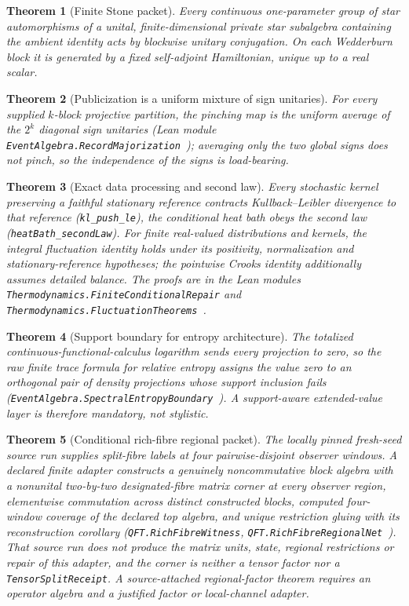 \documentclass[11pt]{article}
\newtheorem{theorem}{Theorem}[section]
\theoremstyle{remark}
\begin{document}
\begin{theorem}[Finite Stone packet]
Every continuous one-parameter group of star automorphisms of a unital,
finite-dimensional private star subalgebra containing the ambient identity
acts by blockwise unitary conjugation. On each Wedderburn block it is generated
by a fixed self-adjoint Hamiltonian, unique up to a real scalar.
\end{theorem}

\begin{theorem}[Publicization is a uniform mixture of sign unitaries]
For every supplied $k$-block projective partition, the pinching map is
the uniform average of the $2^{k}$ diagonal sign unitaries
(Lean module \texttt{EventAlgebra.RecordMajorization}~\cite{ophlean});
averaging only the two
global signs does not pinch, so the independence of the signs is
load-bearing.
\end{theorem}

\begin{theorem}[Exact data processing and second law]
Every stochastic kernel preserving a faithful stationary reference
contracts Kullback--Leibler divergence to that reference
(\texttt{kl\_push\_le}), the conditional heat bath obeys the second law
(\texttt{heatBath\_secondLaw}). For finite real-valued distributions and
kernels, the integral fluctuation identity holds under its positivity,
normalization and stationary-reference hypotheses; the pointwise Crooks
identity additionally assumes detailed balance.
The proofs are in the Lean modules
\texttt{Thermodynamics.FiniteConditionalRepair} and
\texttt{Thermodynamics.FluctuationTheorems}~\cite{ophlean}.
\end{theorem}

\begin{theorem}[Support boundary for entropy architecture]
The totalized continuous-functional-calculus logarithm sends every
projection to zero, so the raw finite trace formula for relative entropy
assigns the value zero to an orthogonal pair of density projections whose
support inclusion fails
(\texttt{EventAlgebra.SpectralEntropyBoundary}~\cite{ophlean}). A support-aware
extended-value layer is therefore mandatory, not stylistic.
\end{theorem}

\begin{theorem}[Conditional rich-fibre regional packet]
The locally pinned fresh-seed source run supplies split-fibre labels at four
pairwise-disjoint observer windows. A declared finite adapter constructs a
genuinely noncommutative block algebra with a nonunital two-by-two
designated-fibre matrix corner at every observer region, elementwise
commutation across distinct constructed blocks, computed four-window coverage
of the declared top algebra, and unique restriction gluing with its
reconstruction corollary
(\texttt{QFT.RichFibreWitness},
\texttt{QFT.RichFibreRegionalNet}~\cite{ophlean}).
That source run does not produce the matrix units, state, regional
restrictions or repair of this adapter, and the corner is neither a tensor
factor nor a
\texttt{TensorSplitReceipt}. A source-attached regional-factor theorem requires an operator
algebra and a justified factor or local-channel adapter.
\end{theorem}
\end{document}
